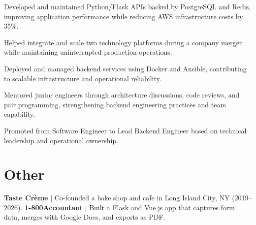 \documentclass[]{plushcv}
\begin{document}
\begin{minipage}[t]{0.70\textwidth}
\begin{tightemize}
\item Developed and maintained Python/Flask APIs backed by PostgreSQL and Redis, improving application performance while reducing AWS infrastructure costs by 35\%.
\item Helped integrate and scale two technology platforms during a company merger while maintaining uninterrupted production operations.
\item Deployed and managed backend services using Docker and Ansible, contributing to scalable infrastructure and operational reliability.
\item Mentored junior engineers through architecture discussions, code reviews, and pair programming, strengthening backend engineering practices and team capability.
\item Promoted from Software Engineer to Lead Backend Engineer based on technical leadership and operational ownership.
\end{tightemize}
\sectionsep

\section{Other}
\textbf{Taste Crème} | Co-founded a bake shop and cafe in Long Island City, NY (2019–2026).
\vspace{4pt}
\newline
\textbf{1-800Accountant} | Built a Flask and Vue.js app that captures form data, merges with Google Docs, and exports as PDF.
\sectionsep


%
%

\end{minipage} 
\end{document}
